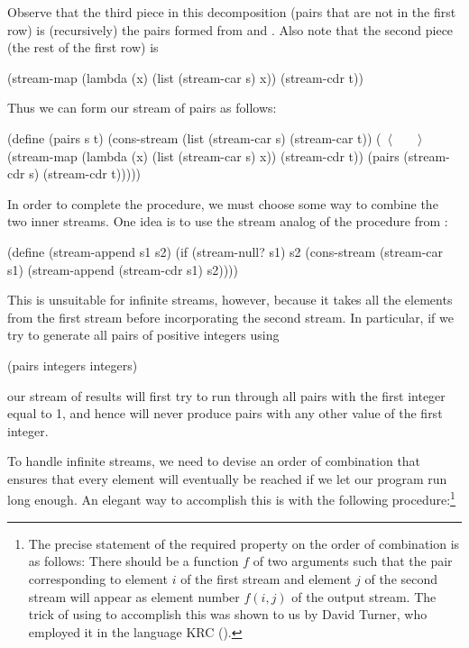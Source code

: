 Observe that the third piece in this decomposition (pairs that are not in the
first row) is (recursively) the pairs formed from  and
.  Also note that the second piece (the rest of the first
row) is

\begin{codeBlock}
(stream-map (lambda (x) (list (stream-car s) x))
            (stream-cdr t))
\end{codeBlock}

\noindent
Thus we can form our stream of pairs as follows:

\begin{codeBlock}
(define (pairs s t)
  (cons-stream
   (list (stream-car s) (stream-car t))
   (~\(\langle \)~~~~\(\rangle \)~
     (stream-map (lambda (x) (list (stream-car s) x))
                 (stream-cdr t))
     (pairs (stream-cdr s) (stream-cdr t)))))
\end{codeBlock}

\noindent
In order to complete the procedure, we must choose some way to combine the two
inner streams.  One idea is to use the stream analog of the 
procedure from :

\begin{codeBlock}
(define (stream-append s1 s2)
  (if (stream-null? s1)
      s2
      (cons-stream (stream-car s1)
                   (stream-append (stream-cdr s1)
                                  s2))))
\end{codeBlock}

\noindent
This is unsuitable for infinite streams, however, because it takes all the
elements from the first stream before incorporating the second stream.  In
particular, if we try to generate all pairs of positive integers using

\begin{codeBlock}
(pairs integers integers)
\end{codeBlock}

\noindent
our stream of results will first try to run through all pairs with the first
integer equal to 1, and hence will never produce pairs with any other value of
the first integer.

To handle infinite streams, we need to devise an order of combination that
ensures that every element will eventually be reached if we let our program run
long enough.  An elegant way to accomplish this is with the following
 procedure:\footnote{The precise statement of the required
property on the order of combination is as follows: There should be a function
\( f \) of two arguments such that the pair corresponding to element \( i \) of the
first stream and element \( j \) of the second stream will appear as element
number \( f(i, j) \) of the output stream.  The trick of using
 to accomplish this was shown to us by David Turner, who
employed it in the language KRC ().}

